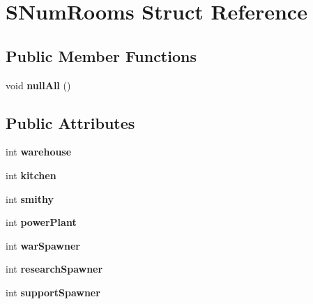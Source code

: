 \hypertarget{structSNumRooms}{\section{S\-Num\-Rooms Struct Reference}
\label{structSNumRooms}
}
\subsection*{Public Member Functions}
\begin{DoxyCompactItemize}
\item 
\hypertarget{structSNumRooms_a71a555ff7f780baf3b9675845bc02303}{void {\bfseries null\-All} ()}\label{structSNumRooms_a71a555ff7f780baf3b9675845bc02303}

\end{DoxyCompactItemize}
\subsection*{Public Attributes}
\begin{DoxyCompactItemize}
\item 
\hypertarget{structSNumRooms_a6f70622f0e488b1f7e03281b6207a947}{int {\bfseries warehouse}}\label{structSNumRooms_a6f70622f0e488b1f7e03281b6207a947}

\item 
\hypertarget{structSNumRooms_aafa421ebc455997d6fb81676bf8aa71b}{int {\bfseries kitchen}}\label{structSNumRooms_aafa421ebc455997d6fb81676bf8aa71b}

\item 
\hypertarget{structSNumRooms_a259fe89270d37c99824962caee106325}{int {\bfseries smithy}}\label{structSNumRooms_a259fe89270d37c99824962caee106325}

\item 
\hypertarget{structSNumRooms_a1afaffd08a84b2718aa6ae356f77179e}{int {\bfseries power\-Plant}}\label{structSNumRooms_a1afaffd08a84b2718aa6ae356f77179e}

\item 
\hypertarget{structSNumRooms_aa787b37183cc6afdb9a9f3fc2609f69f}{int {\bfseries war\-Spawner}}\label{structSNumRooms_aa787b37183cc6afdb9a9f3fc2609f69f}

\item 
\hypertarget{structSNumRooms_aafd21e4f1403027dc0130ad71345871b}{int {\bfseries research\-Spawner}}\label{structSNumRooms_aafd21e4f1403027dc0130ad71345871b}

\item 
\hypertarget{structSNumRooms_a8818792e721e51c595bb585eff8eaa3c}{int {\bfseries support\-Spawner}}\label{structSNumRooms_a8818792e721e51c595bb585eff8eaa3c}

\end{DoxyCompactItemize}


